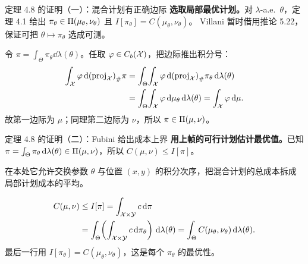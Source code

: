 \begin{frame}{定理 4.8 的证明（一）：混合计划有正确边际}
  \textbf{选取局部最优计划。}\proofskipnote 对 $\lambda$-a.e.\ $\theta$，定理 4.1 给出
  $\pi_{\theta}\in\Pi(\mu_{\theta},\nu_{\theta})$ 且
  $I[\pi_{\theta}]=C(\mu_{\theta},\nu_{\theta})$。
  Villani 暂时借用推论 5.22，保证可把 $\theta\mapsto\pi_{\theta}$ 选成可测。

  令 $\pi=\int_{\Theta}\pi_{\theta}\dd\lambda(\theta)$。任取 $\varphi\in C_b(\mathcal{X})$，把边际推出积分号：
  \[
    \begin{aligned}
      \int_{\mathcal{X}}\varphi\,\mathrm{d}{(\mathrm{proj}_{\mathcal{X}})}_{\#}\pi
      &= \int_{\Theta}\!\int_{\mathcal{X}}\varphi\,\mathrm{d}{(\mathrm{proj}_{\mathcal{X}})}_{\#}\pi_{\theta}\,\mathrm{d}\lambda(\theta)\\
      &= \int_{\Theta}\!\int_{\mathcal{X}}\varphi\,\mathrm{d}\mu_{\theta}\,\mathrm{d}\lambda(\theta)
       = \int_{\mathcal{X}}\varphi\,\mathrm{d}\mu .
    \end{aligned}
  \]
  故第一边际为 $\mu$；同理第二边际为 $\nu$，所以 $\pi\in\Pi(\mu,\nu)$。

\end{frame}

\begin{frame}{定理 4.8 的证明（二）：Fubini 给出成本上界}
  \textbf{用上帧的可行计划估计最优值。}\proofskipnote 已知
  $\pi=\int_{\Theta}\pi_{\theta}\,\mathrm{d}\lambda(\theta)\in\Pi(\mu,\nu)$，所以
  $C(\mu,\nu)\le I[\pi]$。

  在本处它允许交换参数 $\theta$ 与位置 $(x,y)$ 的积分次序，把混合计划的总成本拆成局部计划成本的平均。

  \[
    \begin{aligned}
      C(\mu,\nu)
      &\le I[\pi]
       = \int_{\mathcal{X}\times\mathcal{Y}} c\,\mathrm{d}\pi\\
      &= \int_{\Theta}\!\left(\int_{\mathcal{X}\times\mathcal{Y}} c\,\mathrm{d}\pi_{\theta}\right)\,\mathrm{d}\lambda(\theta)
       = \int_{\Theta} C(\mu_{\theta},\nu_{\theta})\,\mathrm{d}\lambda(\theta).
    \end{aligned}
  \]
  最后一行用 $I[\pi_{\theta}]=C(\mu_{\theta},\nu_{\theta})$，这是每个 $\pi_{\theta}$ 的最优性。
\end{frame}

